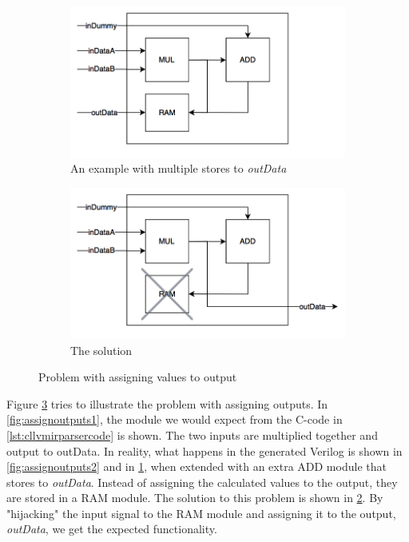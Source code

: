 \begin{figure}
\begin{subfigure}{0.49\textwidth}
       \end{subfigure}%
    \hfill
        \begin{subfigure}{0.49\textwidth}\centering
                    \includegraphics[width=\linewidth]{figs/OutputAssignment3.png}
                \caption{An example with multiple stores to \textit{outData}}
  \label{fig:assignoutputs3}
       \end{subfigure}%
    \hfill
        \begin{subfigure}{0.49\textwidth}\centering
                    \includegraphics[width=\linewidth]{figs/OutputAssignment4.png}
                \caption{The solution}
  \label{fig:assignoutputs4}
       \end{subfigure}%

\caption{\label{fig:assigningoutputs}Problem with assigning values to output}
 \end{figure}
Figure \ref{fig:assigningoutputs} tries to illustrate the problem with assigning outputs. In \cref{fig:assignoutputs1}, the module we would expect from the C-code in \cref{lst:cllvmirparsercode} is shown. The two inputs are multiplied together and output to outData. In reality, what happens in the generated Verilog is shown in \cref{fig:assignoutputs2} and in \cref{fig:assignoutputs3}, when extended with an extra ADD module that stores to \textit{outData}. Instead of assigning the calculated values to the output, they are stored in a RAM module. The solution to this problem is shown in \cref{fig:assignoutputs4}. By "hijacking" the input signal to the RAM module and assigning it to the output, \textit{outData}, we get the expected functionality. 


